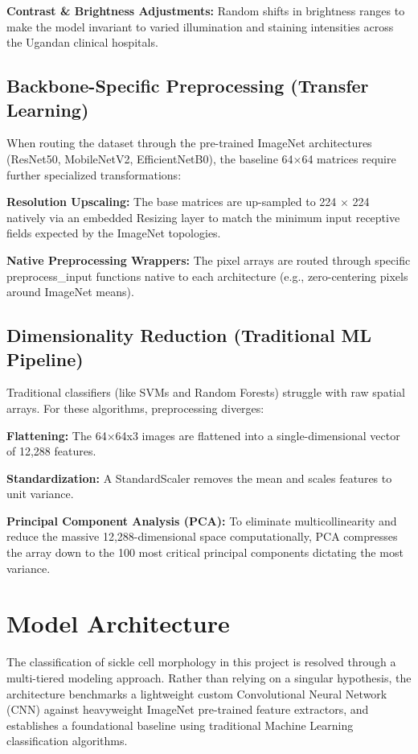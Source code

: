 \noindent\textbf{Contrast \& Brightness Adjustments:} Random shifts in brightness ranges to make the model invariant to varied illumination and staining intensities across the Ugandan clinical hospitals.

\subsection{Backbone-Specific Preprocessing (Transfer Learning)}

When routing the dataset through the pre-trained ImageNet architectures (ResNet50, MobileNetV2, EfficientNetB0), the baseline 64$\times$64 matrices require further specialized transformations:

\noindent\textbf{Resolution Upscaling:} The base matrices are up-sampled to 224 $\times$ 224 natively via an embedded Resizing layer to match the minimum input receptive fields expected by the ImageNet topologies.

\noindent\textbf{Native Preprocessing Wrappers:} The pixel arrays are routed through specific preprocess\_input functions native to each architecture (e.g., zero-centering pixels around ImageNet means).

\subsection{Dimensionality Reduction (Traditional ML Pipeline)}

Traditional classifiers (like SVMs and Random Forests) struggle with raw spatial arrays. For these algorithms, preprocessing diverges:

\noindent\textbf{Flattening:} The 64$\times$64x3 images are flattened into a single-dimensional vector of 12,288 features.

\noindent\textbf{Standardization:} A StandardScaler removes the mean and scales features to unit variance.

\noindent\textbf{Principal Component Analysis (PCA):} To eliminate multicollinearity and reduce the massive 12,288-dimensional space computationally, PCA compresses the array down to the 100 most critical principal components dictating the most variance.

\section{Model Architecture}

The classification of sickle cell morphology in this project is resolved through a multi-tiered modeling approach. Rather than relying on a singular hypothesis, the architecture benchmarks a lightweight custom Convolutional Neural Network (CNN) against heavyweight ImageNet pre-trained feature extractors, and establishes a foundational baseline using traditional Machine Learning classification algorithms.

